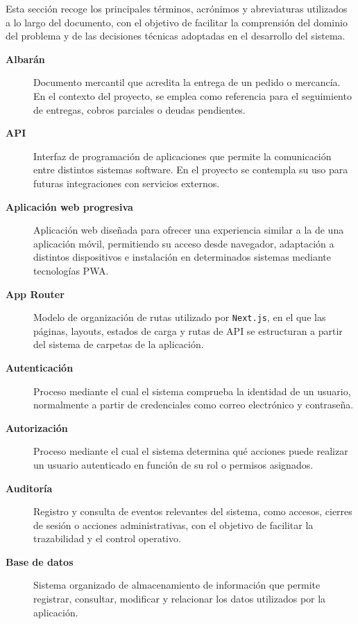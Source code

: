 Esta sección recoge los principales términos, acrónimos y abreviaturas utilizados a lo largo del documento, con el objetivo de facilitar la comprensión del dominio del problema y de las decisiones técnicas adoptadas en el desarrollo del sistema.
\begin{description}

\item[\textbf{Albarán}]
Documento mercantil que acredita la entrega de un pedido o mercancía. En el contexto del proyecto, se emplea como referencia para el seguimiento de entregas, cobros parciales o deudas pendientes.

\item[\textbf{API}]
Interfaz de programación de aplicaciones que permite la comunicación entre distintos sistemas software. En el proyecto se contempla su uso para futuras integraciones con servicios externos.

\item[\textbf{Aplicación web progresiva}]
Aplicación web diseñada para ofrecer una experiencia similar a la de una aplicación móvil, permitiendo su acceso desde navegador, adaptación a distintos dispositivos e instalación en determinados sistemas mediante tecnologías PWA.

\item[\textbf{App Router}]
Modelo de organización de rutas utilizado por \texttt{Next.js}, en el que las páginas, layouts, estados de carga y rutas de API se estructuran a partir del sistema de carpetas de la aplicación.

\item[\textbf{Autenticación}]
Proceso mediante el cual el sistema comprueba la identidad de un usuario, normalmente a partir de credenciales como correo electrónico y contraseña.

\item[\textbf{Autorización}]
Proceso mediante el cual el sistema determina qué acciones puede realizar un usuario autenticado en función de su rol o permisos asignados.

\item[\textbf{Auditoría}]
Registro y consulta de eventos relevantes del sistema, como accesos, cierres de sesión o acciones administrativas, con el objetivo de facilitar la trazabilidad y el control operativo.

\item[\textbf{Base de datos}]
Sistema organizado de almacenamiento de información que permite registrar, consultar, modificar y relacionar los datos utilizados por la aplicación.


\end{description}
